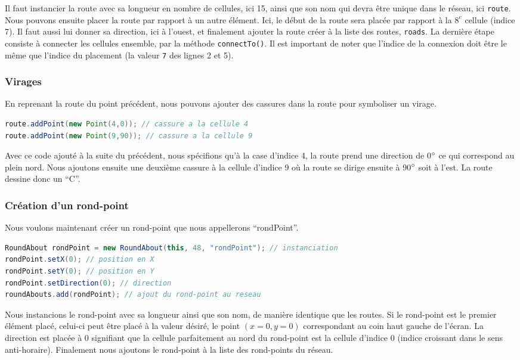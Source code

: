 \documentclass[a4paper,11pt, titlepage]{extarticle}
\begin{document}
Il faut instancier la route avec sa longueur en nombre de cellules, ici 15, ainsi que son nom qui devra être unique dans le réseau, ici \texttt{route}. Nous pouvons ensuite placer la route par rapport à un autre élément. Ici, le début de la route sera placée par rapport à la $8^e$ cellule (indice 7). Il faut aussi lui donner sa direction, ici à l'ouest, et finalement ajouter la route créer à la liste des routes, \texttt{roads}. La dernière étape consiste à connecter les cellules ensemble, par la méthode \texttt{connectTo()}. Il est important de noter que l'indice de la connexion doit être le même que l'indice du placement (la valeur \texttt{7} des lignes 2 et 5).

\subsubsection{Virages}

En reprenant la route du point précédent, nous pouvons ajouter des cassures dans la route pour symboliser un virage.

\begin{lstlisting}[language=Java]
route.addPoint(new Point(4,0)); // cassure a la cellule 4
route.addPoint(new Point(9,90)); // cassure a la cellule 9
\end{lstlisting}

Avec ce code ajouté à la suite du précédent, nous spécifions qu'à la case d'indice 4, la route prend une direction de 0$\degree$ ce qui correspond au plein nord. Nous ajoutons ensuite une deuxième cassure à la cellule d'indice 9 où la route se dirige ensuite à 90$\degree$ soit à l'est. La route dessine donc un ``C''.

\subsubsection{Création d'un rond-point}

Nous voulons maintenant créer un rond-point que nous appellerons ``rondPoint''.

\begin{lstlisting}[language=Java]
RoundAbout rondPoint = new RoundAbout(this, 48, "rondPoint"); // instanciation
rondPoint.setX(0); // position en X
rondPoint.setY(0); // position en Y
rondPoint.setDirection(0); // direction
roundAbouts.add(rondPoint); // ajout du rond-point au reseau
\end{lstlisting}

Nous instancions le rond-point avec sa longueur ainsi que son nom, de manière identique que les routes. Si le rond-point est le premier élément placé, celui-ci peut être placé à la valeur désiré, le point $(x=0,y=0)$ correspondant au coin haut gauche de l'écran. La direction est placée à 0 signifiant que la cellule parfaitement au nord du rond-point est la cellule d'indice 0 (indice croissant dans le sens anti-horaire). Finalement nous ajoutons le rond-point à la liste des rond-points du réseau.
\end{document}

